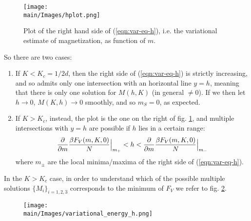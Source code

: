 \documentclass[../../main.tex]{subfiles}
\begin{document}
\begin{figure}[H]
    \centering
    \texttt{[image: \\main/Images/hplot.png]}
    \caption{Plot of the right hand side of (\ref{eqn:var-eq-h}), i.e. the variational estimate of magnetization,
as function of $m$.} %
    \label{fig:hplot}
\end{figure}

So there are two cases:
\begin{enumerate}
    \item If $K < K_c = 1/2d$, then the right side of (\ref{eqn:var-eq-h}) is strictly increasing, and so admits only one intersection with an horizontal line $y = h$, meaning that there is only one solution for $M(h,K)$ (in general $\neq 0$). If we then let $h \to 0$, $M(K,h) \to 0$ smoothly, and so $m_S = 0$, as expected. 
    \item If $K > K_c$, instead, the plot is the one on the right of fig. \ref{fig:hplot}, and multiple intersections with $y=h$ are possible if $h$ lies in a certain range:
    \begin{align*}
        \pdv{m} \frac{\beta F_V(m,K,0)}{N} \Big|_
        {m_+} < h < \pdv{m} \frac{\beta F_V(m,K,0) }{N}\Big|_{m_-}
    \end{align*}
    where $m_\pm$ are the local minima/maxima of the right side of (\ref{eqn:var-eq-h}).
\end{enumerate}

In the $K>K_c$ case, in order to understand which of the possible multiple solutions $\{M_i\}_{i=1,2,3}$ corresponds to the minimum of $F_V$ we refer to fig. \ref{fig:variational_energy_h}.

\begin{figure}[H]
    \centering
    \texttt{[image: \\main/Images/variational\_energy\_h.png]}
    \caption{} %
    \label{fig:variational_energy_h}
\end{figure}
\end{document}

